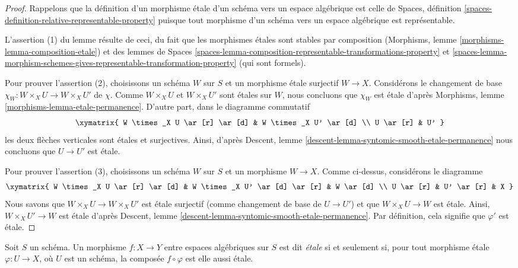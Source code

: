 \begin{proof}
Rappelons que la définition d'un morphisme \'etale d'un schéma vers un
espace algébrique est celle de
Spaces, définition
\ref{spaces-definition-relative-representable-property}
puisque tout morphisme d'un schéma vers un espace algébrique
est représentable.

\medskip\noindent
L'assertion (1) du lemme résulte de ceci, du fait que
les morphismes \'etales sont stables par composition
(Morphisms, lemme
\ref{morphisms-lemma-composition-etale})
et des lemmes
de Spaces
\ref{spaces-lemma-composition-representable-transformations-property} et
\ref{spaces-lemma-morphism-schemes-gives-representable-transformation-property}
(qui sont formels).

\medskip\noindent
Pour prouver l'assertion (2), choisissons un schéma $W$ sur $S$ et un
morphisme \'etale surjectif $W \to X$. Considérons le changement de base
$\chi_W : W \times_X U \to W \times_X U'$ de $\chi$.
Comme $W \times_X U$ et $W \times_X U'$ sont \'etales sur $W$, nous concluons que
$\chi_W$ est \'etale d'après
Morphisms, lemme \ref{morphisms-lemma-etale-permanence}.
D'autre part, dans le diagramme commutatif
$$
\xymatrix{
W \times_X U \ar[r] \ar[d] & W \times_X U' \ar[d] \\
U \ar[r] & U'
}
$$
les deux flèches verticales sont \'etales et surjectives.
Ainsi, d'après
Descent, lemme \ref{descent-lemma-syntomic-smooth-etale-permanence}
nous concluons que $U \to U'$ est \'etale.

\medskip\noindent
Pour prouver l'assertion (3), choisissons un schéma $W$ sur $S$ et un morphisme $W \to X$.
Comme ci-dessus, considérons le diagramme
$$
\xymatrix{
W \times_X U \ar[r] \ar[d] & W \times_X U' \ar[d] \ar[r] & W \ar[d] \\
U \ar[r] & U' \ar[r] & X
}
$$
Nous savons que $W \times_X U \to W \times_X U'$ est \'etale surjectif
(comme changement de base de $U \to U'$)
et que $W \times_X U \to W$ est \'etale. Ainsi, $W \times_X U' \to W$
est \'etale d'après Descent, lemme
\ref{descent-lemma-syntomic-smooth-etale-permanence}. Par définition,
cela signifie que $\varphi'$ est \'etale.
\end{proof}

\begin{definition}
\label{definition-etale}
Soit $S$ un schéma.
Un morphisme $f : X \to Y$ entre espaces algébriques sur $S$ est
dit {\it \'etale} si et seulement si, pour tout morphisme \'etale
$\varphi : U \to X$, où $U$ est un schéma, la composée
$f \circ \varphi$ est elle aussi \'etale.
\end{definition}

